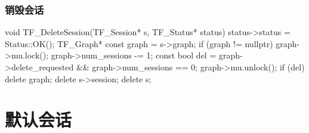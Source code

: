 \begin{content}
\subsubsection{销毁会话}

\begin{leftbar}
\begin{c++}
void TF_DeleteSession(TF_Session* s, TF_Status* status) {
  status->status = Status::OK();
  TF_Graph* const graph = s->graph;
  if (graph != nullptr) {
    graph->mu.lock();
    graph->num_sessions -= 1;
    const bool del = graph->delete_requested && graph->num_sessions == 0;
    graph->mu.unlock();
    if (del) delete graph;
  }
  delete s->session;
  delete s;
}
\end{c++}
\end{leftbar}
\end{content}

\section{默认会话}

